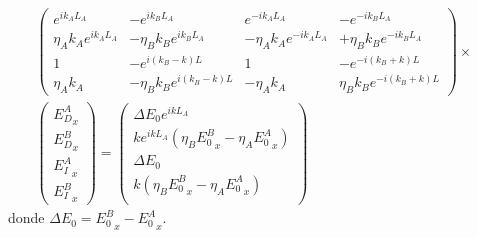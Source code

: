 \documentclass{iopart}
\begin{document}
\begin{eqnarray}
\left(
\begin{array}{cccc}
e^{ik_{A}L_A}&-e^{ik_{B}L_A}&e^{-ik_{A}L_A}&-e^{-ik_{B}L_A}\\
\eta_Ak_Ae^{ik_AL_A}&-\eta_Bk_Be^{ik_{B}L_A}&-
\eta_Ak_Ae^{-ik_{A}L_A}&+\eta_Bk_Be^{-ik_{B}L_A}\\
1&-e^{i(k_{B}-k)L}&1&-e^{-i(k_{B}+k)L}\\
\eta_Ak_A&-\eta_Bk_Be^{i(k_{B}-k)L}&-\eta_Ak_A&\eta_Bk_Be^{-i(k_{B}+k)L}
\end{array}
\right) \times  &\\
\left(
\begin{array}{c}
 {E^{A}_{D}}_{x}\\
 {E^{B}_{D}}_{x}\\
 {E^{A}_{I}}_{x}\\
 {E^{B}_{I}}_{x}
\end{array}
\right)=
\left(
\begin{array}{c}
\Delta E_0  e^{ikL_A}\\
k e^{ikL_A}(\eta_B{E^{B}_{0}}_{x}-\eta_A{E^{A}_{0}}_{x})\\
\Delta E_0  \\
k(\eta_B{E^{B}_{0}}_{x}-\eta_A{E^{A}_{0}}_{x})\\
\end{array}
\right)&
\end{eqnarray}
donde $\Delta E_0 ={E_{0}^B}_{x}-{E_{0}^A}_{x}$. 
\end{document}
